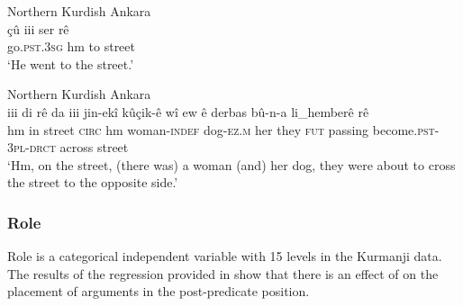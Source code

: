 \documentclass[output=paper,colorlinks,citecolor=brown]{langscibook}
\begin{document}
\newpage
\ea\label{Bilingual:ex:10} 
Northern Kurdish Ankara \citep[Y, 626]{iefremenko2021KurdishAnkara} \\
\gll çû iii ser rê \\
go\textsc{.pst.3sg} hm to street \\
\glt `He went to the street.' 
\z

\ea\label{Bilingual:ex:11} 
Northern Kurdish Ankara \citep[C, 57]{iefremenko2021KurdishAnkara} \\
\gll iii di rê da iii jin-ekî kûçik-ê wî ew ê derbas bû-n-a li\_hemberê rê \\
hm in street \textsc{circ} hm woman\textsc{-indef} dog\textsc{-ez.m} her they \textsc{fut} passing become\textsc{.pst-3pl-drct} across street \\
\glt `Hm, on the street, (there was) a woman (and) her dog, they were about to cross the street to the opposite side.' 
\z

\subsubsection{Role} Role is a categorical independent variable with 15 levels in the Kurmanji data. The results of the regression provided in  show that there is an effect of  on the placement of arguments in the post-predicate position.
\end{document}
